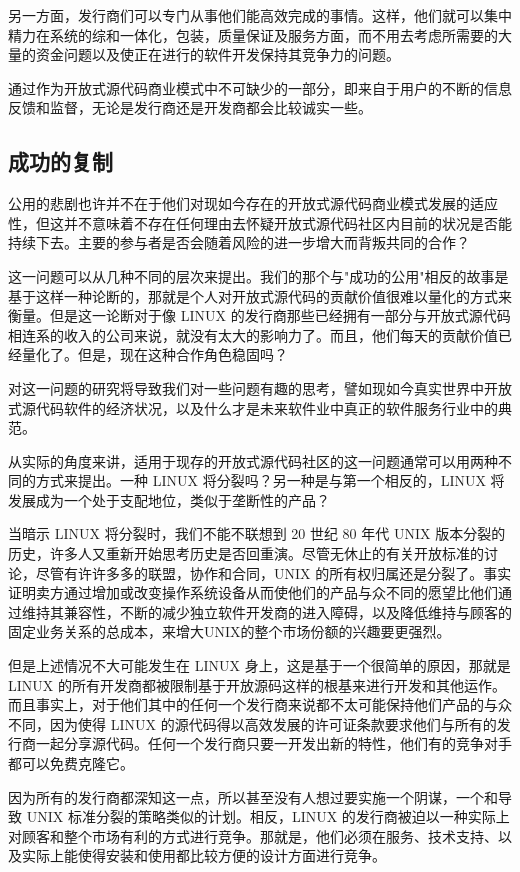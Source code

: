 另一方面，发行商们可以专门从事他们能高效完成的事情。这样，他们就可以集中精力在系统的综和一体化，包装，质量保证及服务方面，而不用去考虑所需要的大量的资金问题以及使正在进行的软件开发保持其竞争力的问题。


通过作为开放式源代码商业模式中不可缺少的一部分，即来自于用户的不断的信息反馈和监督，无论是发行商还是开发商都会比较诚实一些。

\subsection{成功的复制}
公用的悲剧也许并不在于他们对现如今存在的开放式源代码商业模式发展的适应性，但这并不意味着不存在任何理由去怀疑开放式源代码社区内目前的状况是否能持续下去。主要的参与者是否会随着风险的进一步增大而背叛共同的合作？


这一问题可以从几种不同的层次来提出。我们的那个与"成功的公用"相反的故事是基于这样一种论断的，那就是个人对开放式源代码的贡献价值很难以量化的方式来衡量。但是这一论断对于像 LINUX 的发行商那些已经拥有一部分与开放式源代码相连系的收入的公司来说，就没有太大的影响力了。而且，他们每天的贡献价值已经量化了。但是，现在这种合作角色稳固吗？


对这一问题的研究将导致我们对一些问题有趣的思考，譬如现如今真实世界中开放式源代码软件的经济状况，以及什么才是未来软件业中真正的软件服务行业中的典范。


从实际的角度来讲，适用于现存的开放式源代码社区的这一问题通常可以用两种不同的方式来提出。一种 LINUX 将分裂吗？另一种是与第一个相反的，LINUX 将发展成为一个处于支配地位，类似于垄断性的产品？


当暗示 LINUX 将分裂时，我们不能不联想到 20 世纪 80 年代 UNIX 版本分裂的历史，许多人又重新开始思考历史是否回重演。尽管无休止的有关开放标准的讨论，尽管有许许多多的联盟，协作和合同，UNIX 的所有权归属还是分裂了。事实证明卖方通过增加或改变操作系统设备从而使他们的产品与众不同的愿望比他们通过维持其兼容性，不断的减少独立软件开发商的进入障碍，以及降低维持与顾客的固定业务关系的总成本，来增大UNIX的整个市场份额的兴趣要更强烈。


但是上述情况不大可能发生在 LINUX 身上，这是基于一个很简单的原因，那就是 LINUX 的所有开发商都被限制基于开放源码这样的根基来进行开发和其他运作。而且事实上，对于他们其中的任何一个发行商来说都不太可能保持他们产品的与众不同，因为使得 LINUX 的源代码得以高效发展的许可证条款要求他们与所有的发行商一起分享源代码。任何一个发行商只要一开发出新的特性，他们有的竞争对手都可以免费克隆它。


因为所有的发行商都深知这一点，所以甚至没有人想过要实施一个阴谋，一个和导致 UNIX 标准分裂的策略类似的计划。相反，LINUX 的发行商被迫以一种实际上对顾客和整个市场有利的方式进行竞争。那就是，他们必须在服务、技术支持、以及实际上能使得安装和使用都比较方便的设计方面进行竞争。


